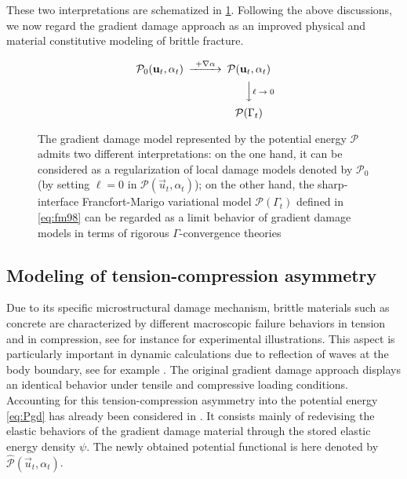 These two interpretations are schematized in \cref{fig:twointerpretationdamage}. Following the above discussions, we now regard the gradient damage approach as an improved physical and material constitutive modeling of brittle fracture.
\begin{figure}[htbp]
\centering
\[
\begin{CD}
\mathcal{P}_0(\vec{u}_t,\alpha_t) @>\text{+$\nabla\alpha$}>> \mathcal{P}(\vec{u}_t,\alpha_t) \\
@. @VV\text{$\ell\to 0$}V \\
@. \mathcal{P}(\Gamma_t)
\end{CD}
\]
\caption{The gradient damage model represented by the potential energy $\mathcal{P}$ admits two different interpretations: on the one hand, it can be considered as a regularization of local damage models denoted by $\mathcal{P}_0$ (by setting $\ell=0$ in $\mathcal{P}(\vec{u}_t,\alpha_t)$); on the other hand, the sharp-interface Francfort-Marigo variational model $\mathcal{P}(\Gamma_t)$ defined in \eqref{eq:fm98} can be regarded as a limit behavior of gradient damage models in terms of rigorous $\Gamma$-convergence theories \cite{Braides:2002}} \label{fig:twointerpretationdamage}
\end{figure}

\subsection{Modeling of tension-compression asymmetry} \label{sec:tcmodeling}
Due to its specific microstructural damage mechanism, brittle materials such as concrete are characterized by different macroscopic failure behaviors in tension and in compression, see for instance \cite{KupferGerstle:1973,LeeSongH:2004} for experimental illustrations. This aspect is particularly important in dynamic calculations due to reflection of waves at the body boundary, see for example \cite{MoreauMoesPicartStainier:2015}. The original gradient damage approach displays an identical behavior under tensile and compressive loading conditions. Accounting for this tension-compression asymmetry into the potential energy \eqref{eq:Pgd} has already been considered in \cite{PieroLancioniMarch:2007,AmorMarigoMaurini:2009,FreddiRoyer-Carfagni:2010}. It consists mainly of redevising the elastic behaviors of the gradient damage material through the stored elastic energy density $\psi$. The newly obtained potential functional is here denoted by $\widehat{\mathcal{P}}(\vec{u}_t,\alpha_t)$.

